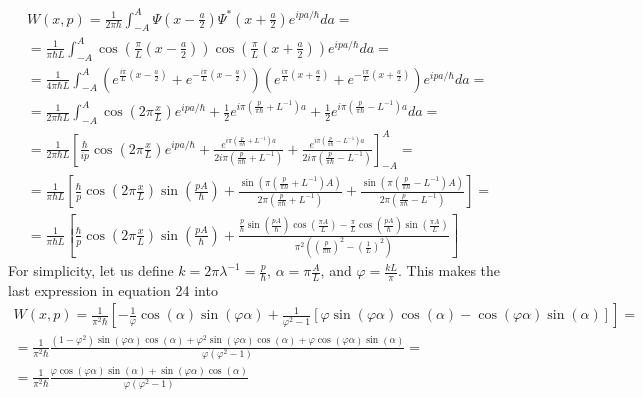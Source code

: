\documentclass{article}
\begin{document}
\begin{equation}
\begin{gathered}
    W(x, p) = \frac{1}{2\pi\hbar} \int_{-A}^{A} \Psi\left(x - \frac{a}{2}\right) \Psi^* \left(x + \frac{a}{2}\right) e^{ipa/\hbar}da = \\
    = \frac{1}{\pi\hbar L} \int_{-A}^{A}
    \cos(\frac{\pi}{L}\left(x - \frac{a}{2}\right))
    \cos(\frac{\pi}{L}\left(x + \frac{a}{2}\right))
    e^{ipa/\hbar}da = \\
    = \frac{1}{4\pi\hbar L} \int_{-A}^{A}
    \left(e^{\frac{i\pi}{L}(x-\frac{a}{2})} + e^{-\frac{i\pi}{L}(x-\frac{a}{2})}\right)
    \left(e^{\frac{i\pi}{L}(x+\frac{a}{2})} + e^{-\frac{i\pi}{L}(x+\frac{a}{2})}\right)
    e^{ipa/\hbar}da = \\
    = \frac{1}{2\pi\hbar L} \int_{-A}^{A}
    \cos(2\pi\frac{x}{L})e^{ipa/\hbar}
    + \frac{1}{2}e^{i\pi(\frac{p}{\pi\hbar} + L^{-1})a}
    + \frac{1}{2}e^{i\pi(\frac{p}{\pi\hbar} - L^{-1})a}
    da= \\
    = \frac{1}{2\pi\hbar L} \left[
    \frac{\hbar}{ip}\cos(2\pi\frac{x}{L})e^{ipa/\hbar}
    + \frac{e^{i\pi(\frac{p}{\pi\hbar} + L^{-1})a}}{2i\pi(\frac{p}{\pi\hbar} + L^{-1})}
    + \frac{e^{i\pi(\frac{p}{\pi\hbar} - L^{-1})a}}{2i\pi(\frac{p}{\pi\hbar} - L^{-1})}
    \right]_{-A}^{A} = \\
    = \frac{1}{\pi\hbar L} \left[
    \frac{\hbar}{p}\cos(2\pi\frac{x}{L})\sin(\frac{pA}{\hbar})
    + \frac{\sin(\pi(\frac{p}{\pi\hbar} + L^{-1})A)}{2\pi(\frac{p}{\pi\hbar} + L^{-1})}
    + \frac{\sin(\pi(\frac{p}{\pi\hbar} - L^{-1})A)}{2\pi(\frac{p}{\pi\hbar} - L^{-1})}
    \right] = \\
    = \frac{1}{\pi\hbar L} \left[
    \frac{\hbar}{p}\cos(2\pi\frac{x}{L})\sin(\frac{pA}{\hbar})
    + \frac{\frac{p}{\hbar}\sin(\frac{pA}{\hbar})\cos(\frac{\pi A}{L}) - \frac{\pi}{L}\cos(\frac{pA}{\hbar})\sin(\frac{\pi A}{L})}
    {\pi^2\left(\left(\frac{p}{\pi\hbar}\right)^2 - \left(\frac{1}{L}\right)^2\right)}
    \right]
\end{gathered}
\end{equation}
For simplicity, let us define $k = 2\pi\lambda^{-1} = \frac{p}{\hbar}$, $\alpha = \pi\frac{A}{L}$, and $\varphi = \frac{kL}{\pi}$. This makes the last expression in equation 24 into
\begin{equation}
\begin{gathered}
    W(x, p) = \frac{1}{\pi^2 \hbar} \left[
    -\frac{1}{\varphi}\cos(\alpha)\sin(\varphi \alpha)
    + \frac{1}{\varphi^2 - 1}\left[\varphi\sin(\varphi \alpha)\cos(\alpha) - \cos(\varphi \alpha)\sin(\alpha)\right] \right] = \\
    = \frac{1}{\pi^2 \hbar}
    \frac{(1-\varphi^2)\sin(\varphi \alpha)\cos(\alpha) + \varphi^2\sin(\varphi\alpha)\cos(\alpha) + \varphi\cos(\varphi\alpha)\sin(\alpha)}{\varphi(\varphi^2 - 1)} = \\
    = \frac{1}{\pi^2 \hbar}
    \frac{\varphi\cos(\varphi\alpha)\sin(\alpha) + \sin(\varphi \alpha)\cos(\alpha)}{\varphi(\varphi^2 - 1)}
\end{gathered}
\end{equation}
\end{document}
